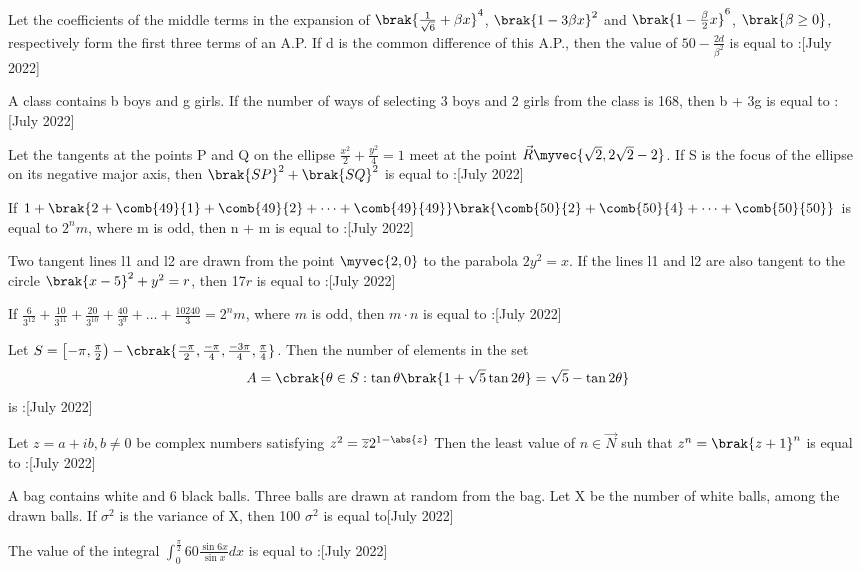 \iffalse
\title{2022}
\author{EE24BTECH11012}
\section{integer}
\fi
	\item Let the coefficients of the middle terms in the expansion of $\brak{\frac{1}{\sqrt{6}} + \beta x }^4$, $\brak{1 - 3 \beta x}^2$ and $\brak{1 - \frac{\beta}{2} x}^6$, $\brak{\beta \geq 0}$, respectively form the first three terms of an A.P. If d is the common difference of this A.P., then the value of $50 - \frac{2d}{\beta^{2}}$ is equal to :\hfill{[July 2022]}
	\item A class contains b boys and g girls. If the number of ways of selecting 3 boys and 2 girls from the class is 168, then b + 3g is equal to :\hfill{[July 2022]}
	\item Let the tangents at the points P and Q on the ellipse $\frac{x^2}{2} + \frac{y^2}{4} = 1$ meet at the point $\vec{R}\myvec{\sqrt{2}, 2\sqrt{2}-2}$. If S is the focus of the ellipse on its negative major axis, then $\brak{SP}^2 + \brak{SQ}^2$ is equal to :\hfill{[July 2022]}
	\item  If $ 1 + \brak{2 + \comb{49}{1} + \comb{49}{2} + \dots + \comb{49}{49}}\brak{\comb{50}{2} + \comb{50}{4} + \dots + \comb{50}{50}}$ is equal to $2^{n}m$, where m is odd, then n + m is equal to :\hfill{[July 2022]}
	\item Two tangent lines l1 and l2 are drawn from the point $\myvec{2,0}$ to the parabola $2y^2 = x$. If the lines l1 and l2 are also tangent to the circle $\brak{x-5}^2 + y^2 = r$, then 17$r$ is equal to :\hfill{[July 2022]}
	\item If $\frac{6}{3^{12}} + \frac{10}{3^{11}} + \frac{20}{3^{10}} + \frac{40}{3^{9}} + \dots + \frac{10240}{3} = 2^{n}{m}$, where $m$ is odd, then $m\cdot n$ is equal to :\hfill{[July 2022]}
	\item Let $S = \left[{-\pi, \frac{\pi}{2}}\right) - \cbrak{\frac{-\pi}{2}, \frac{-\pi}{4}, \frac{-3\pi}{4}, \frac{\pi}{4}}$. Then the number of elements in the set $$ A = \cbrak{\theta \in S : \tan{\theta}\brak{1 + \sqrt{5}\tan{2\theta}} = \sqrt{5} - \tan{2\theta}}$$ is :\hfill{[July 2022]}
	\item Let $ z = a + ib, b \neq 0$ be complex numbers satisfying $z^2 = \overline{z} 2^{1 - \abs{z}}$ Then the least value of $n \in \vec{N}$ suh that $z^{n} = \brak{z+1}^{n}$ is equal to :\hfill{[July 2022]}
	\item A bag contains  white and 6 black balls. Three balls are drawn at random from the bag. Let X be the number of white balls, among the drawn balls. If $\sigma^2$ is the variance of X, then 100 $\sigma^2$ is equal to\hfill{[July 2022]}
	\item The value of the integral $\int_{0}^{\frac{\pi}{2}} 60 \frac{\sin{6x}}{\sin{x}} dx $ is equal to :\hfill{[July 2022]}

%
